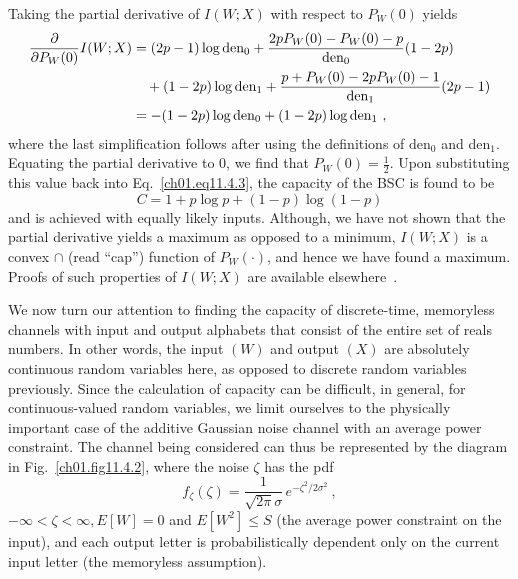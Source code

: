 \begin{example}
Taking the partial derivative of $ I (W;X) $ with respect to $ P_W (0)$ yields
\begin{align}
 \frac{\partial}{\partial P_W(0) } I(W;X) & = (2p - 1)
 \log \text{den}_0 +
 \frac{2 p P_W (0) - P_W (0) - p }
 { \text{den}_0 } (1 - 2p)
\notag\\
 & \quad {} +
 (1 - 2p) \log \text{den}_1 +
 \frac{p +P_W (0) - 2p P_W (0) - 1 }{ \text{den}_1 } (2p - 1 )
 \notag\\
 & = -  (1- 2p ) \log \text{den}_0 + (1 - 2 p) \log \text{den}_1~,
\label{ch01.eq11.4.4}
\end{align}
where the last simplification follows after using the definitions of
$ \text{den}_0 $ and
$ \text{den}_1 $. Equating the partial derivative to $0$, we find that
$P_W(0) = \tfrac{1}{2}$. Upon
substituting  this value back into Eq.~\eqref{ch01.eq11.4.3}, the capacity of
the BSC is found
to be
\begin{equation}
  C = 1 + p \log p + ( 1 - p ) \log ( 1 - p )
\label{ch01.eq11.4.5}
\end{equation}
and is achieved with equally likely inputs. Although, we have not shown that
the partial derivative yields a maximum as opposed to a minimum, $I(W;X)$
is a convex $\cap$ (read ``cap'') function of $P_W (\cdot) $, and hence we
have found a maximum.
Proofs of such properties of $I(W;X)$ are available
elsewhere~\cite{Hoetal2005}.
\end{example}

We now turn our attention to finding the capacity of discrete-time,
memoryless
channels with input and output alphabets that consist of the entire set
of reals numbers. In other words, the input $(W)$ and output $(X)$ are
absolutely
continuous random variables here, as opposed to discrete random variables
previously. Since the calculation of capacity can be difficult, in general,
for
continuous-valued random variables, we limit ourselves to the physically
important case of the additive Gaussian noise channel with an average power
constraint. The channel being considered can thus be represented by the
diagram in Fig.~\ref{ch01.fig11.4.2}, where the noise $\zeta$ has the pdf
\begin{equation}
 f_{\zeta}(\zeta) = \frac{1}{\sqrt{2 \pi} \sigma }
 \,  e^{-\zeta^2/2\sigma^2} ~,
\label{ch01.eq11.4.6}
\end{equation}
$ - \infty < \zeta < \infty, E [W] = 0 $ and $ E [W^2] \leq S $
(the average power constraint on the input),
and each output letter is probabilistically dependent only on the current
input letter (the memoryless assumption).

